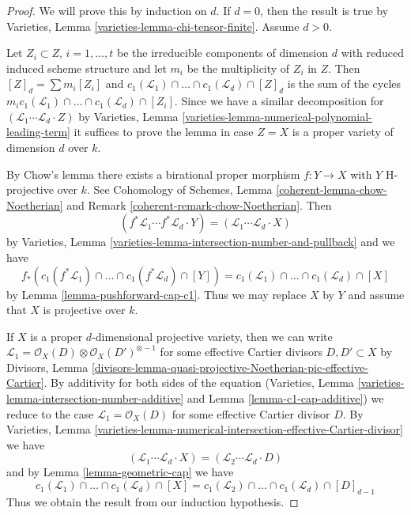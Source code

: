 \begin{proof}
We will prove this by induction on $d$. If $d = 0$, then the result is
true by Varieties, Lemma \ref{varieties-lemma-chi-tensor-finite}.
Assume $d > 0$.

\medskip\noindent
Let $Z_i \subset Z$, $i = 1, \ldots, t$ be the irreducible components
of dimension $d$ with reduced induced scheme structure and let $m_i$ be the
multiplicity of $Z_i$ in $Z$. Then $[Z]_d = \sum m_i[Z_i]$ and
$c_1(\mathcal{L}_1) \cap \ldots \cap c_1(\mathcal{L}_d) \cap [Z]_d$
is the sum of the cycles
$m_i c_1(\mathcal{L}_1) \cap \ldots \cap c_1(\mathcal{L}_d) \cap [Z_i]$.
Since we have a similar decomposition for
$(\mathcal{L}_1 \cdots \mathcal{L}_d \cdot Z)$ by
Varieties, Lemma \ref{varieties-lemma-numerical-polynomial-leading-term}
it suffices to prove the lemma in case $Z = X$
is a proper variety of dimension $d$ over $k$.

\medskip\noindent
By Chow's lemma there exists a birational proper morphism $f : Y \to X$
with $Y$ H-projective over $k$. See Cohomology of Schemes, Lemma
\ref{coherent-lemma-chow-Noetherian} and Remark
\ref{coherent-remark-chow-Noetherian}. Then
$$
(f^*\mathcal{L}_1 \cdots f^*\mathcal{L}_d \cdot Y) =
(\mathcal{L}_1 \cdots \mathcal{L}_d \cdot X)
$$
by Varieties, Lemma \ref{varieties-lemma-intersection-number-and-pullback}
and we have
$$
f_*(c_1(f^*\mathcal{L}_1) \cap \ldots \cap c_1(f^*\mathcal{L}_d) \cap [Y]) =
c_1(\mathcal{L}_1) \cap \ldots \cap c_1(\mathcal{L}_d) \cap [X]
$$
by Lemma \ref{lemma-pushforward-cap-c1}. Thus we may replace $X$ by $Y$
and assume that $X$ is projective over $k$.

\medskip\noindent
If $X$ is a proper $d$-dimensional projective variety, then we can
write $\mathcal{L}_1 = \mathcal{O}_X(D) \otimes \mathcal{O}_X(D')^{\otimes -1}$
for some effective Cartier divisors $D, D' \subset X$
by Divisors, Lemma
\ref{divisors-lemma-quasi-projective-Noetherian-pic-effective-Cartier}.
By additivity for both sides of the equation
(Varieties, Lemma \ref{varieties-lemma-intersection-number-additive} and
Lemma \ref{lemma-c1-cap-additive})
we reduce to the case $\mathcal{L}_1 = \mathcal{O}_X(D)$ for some
effective Cartier divisor $D$.
By Varieties, Lemma
\ref{varieties-lemma-numerical-intersection-effective-Cartier-divisor}
we have
$$
(\mathcal{L}_1 \cdots \mathcal{L}_d \cdot X) =
(\mathcal{L}_2 \cdots \mathcal{L}_d \cdot D)
$$
and by Lemma \ref{lemma-geometric-cap} we have
$$
c_1(\mathcal{L}_1) \cap \ldots \cap c_1(\mathcal{L}_d) \cap [X] =
c_1(\mathcal{L}_2) \cap \ldots \cap c_1(\mathcal{L}_d) \cap [D]_{d - 1}
$$
Thus we obtain the result from our induction hypothesis.
\end{proof}








